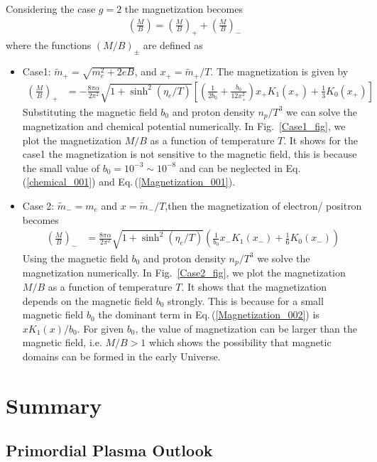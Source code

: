 \documentclass[universe,article,submit,moreauthors,pdftex,a4paper]{Definitions/mdpi}
\newcommand{\req}[1]{Eq.\,(\ref{#1})}
\newcommand*{\rf}[1]{Fig.~{\ref{#1}}}
\begin{document}
Considering the case $g=2$ the magnetization becomes
\begin{align}
\left(\frac{M}{B}\right)=\left(\frac{M}{B}\right)_++\left(\frac{M}{B}\right)
_-
\end{align}
where the functions $(M/B)_\pm$ are defined as 
\begin{itemize}
  \item Case1: $\tilde m_+=\sqrt{m^2_e+2eB}$, and $x_+=\tilde m_+/T$. The magnetization is given by
  \begin{align}\label{Magnetization_001}
 \left(\frac{M}{B}\right)_+&=-\frac{8\pi\alpha}{2\pi^2}\sqrt{1+\sinh^2(\eta_e/T)}\left[\left(\frac{1}{2b_0}+\frac{b_0}{12x_+^2}\right)x_+K_1(x_+)+\frac{1}{3}K_0(x_+)\right]
   \end{align}
Substituting the magnetic field $b_0$ and proton density $n_p/T^3$  we can solve the magnetization and chemical potential numerically. In \rf{Case1_fig}, we plot the  magnetization $M/B$ as a function of temperature $T$. It shows for the case1 the magnetization is not sensitive to the magnetic field, this is because the small value of $b_0=10^{-3}\sim10^{-8}$ and can be neglected in \req{chemical_001} and \req{Magnetization_001}.
\\
  \item Case 2: $\tilde m_-=m_e$ and $x=\tilde m_-/T$,then the magnetization of electron/ positron becomes
\begin{align}\label{Magnetization_002}
\left(\frac{M}{B}\right)_-&=\frac{8\pi\alpha}{2\pi^2}\sqrt{1+\sinh^2(\eta_e/T)}\left(\frac{1}{b_0}x_-K_1(x_-)+\frac{1}{6}K_0(x_-)\right)
\end{align}
Using the magnetic field $b_0$ and proton density $n_p/T^3$ we solve the magnetization  numerically. In \rf{Case2_fig}, we plot the  magnetization $M/B$ as a function of temperature $T$. It shows that the magnetization depends on the magnetic field $b_0$ strongly. This is because for a small magnetic field $b_0$ the dominant term in \req{Magnetization_002} is $xK_1(x)/b_0$. For given $b_0$, the value of magnetization can be larger than the magnetic field, i.e. $M/B>1$  which shows the possibility that magnetic domains can be formed in the early Universe.
\end{itemize}

\section{Summary}\label{Summary}
\subsection{Primordial Plasma Outlook}
\end{document}
